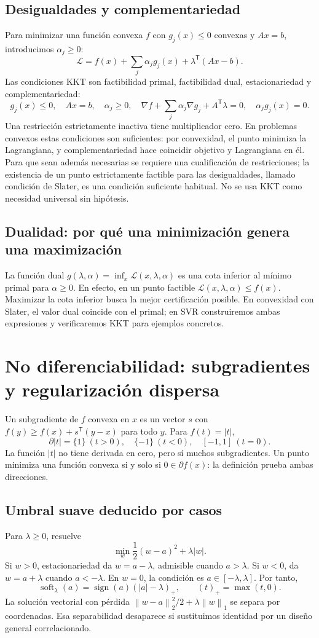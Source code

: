 \documentclass[11pt,a4paper]{article}
\newcommand{\T}{^{\mathsf T}}
\newcommand{\norm}[1]{\left\lVert #1\right\rVert}
\DeclareMathOperator{\sign}{sign}
\theoremstyle{definition}
\begin{document}
\subsection{Desigualdades y complementariedad}
Para minimizar una función convexa $f$ con $g_j(x)\le0$ convexas y $Ax=b$, introducimos $\alpha_j\ge0$:
\[
\mathcal L=f(x)+\sum_j\alpha_jg_j(x)+\lambda\T(Ax-b).
\]
Las condiciones KKT son factibilidad primal, factibilidad dual, estacionariedad y complementariedad:
\[
g_j(x)\le0,\quad Ax=b,\quad\alpha_j\ge0,\quad
\nabla f+\sum_j\alpha_j\nabla g_j+A\T\lambda=0,\quad\alpha_jg_j(x)=0.
\]
Una restricción estrictamente inactiva tiene multiplicador cero. En problemas convexos estas condiciones son suficientes: por convexidad, el punto minimiza la Lagrangiana, y complementariedad hace coincidir objetivo y Lagrangiana en él. Para que sean además necesarias se requiere una cualificación de restricciones; la existencia de un punto estrictamente factible para las desigualdades, llamado condición de Slater, es una condición suficiente habitual. No se usa KKT como necesidad universal sin hipótesis.
\subsection{Dualidad: por qué una minimización genera una maximización}
La función dual $g(\lambda,\alpha)=\inf_x\mathcal L(x,\lambda,\alpha)$ es una cota inferior al mínimo primal para $\alpha\ge0$. En efecto, en un punto factible $\mathcal L(x,\lambda,\alpha)\le f(x)$. Maximizar la cota inferior busca la mejor certificación posible. En convexidad con Slater, el valor dual coincide con el primal; en SVR construiremos ambas expresiones y verificaremos KKT para ejemplos concretos.

\section{No diferenciabilidad: subgradientes y regularización dispersa}
Un subgradiente de $f$ convexa en $x$ es un vector $s$ con $f(y)\ge f(x)+s\T(y-x)$ para todo $y$. Para $f(t)=|t|$,
\[
\partial|t|=\{1\}\ (t>0),\quad\{-1\}\ (t<0),\quad[-1,1]\ (t=0).
\]
La función $|t|$ no tiene derivada en cero, pero sí muchos subgradientes. Un punto minimiza una función convexa si y solo si $0\in\partial f(x)$: la definición prueba ambas direcciones.
\subsection{Umbral suave deducido por casos}
Para $\lambda\ge0$, resuelve
\[
\min_w\frac12(w-a)^2+\lambda|w|.
\]
Si $w>0$, estacionariedad da $w=a-\lambda$, admisible cuando $a>\lambda$. Si $w<0$, da $w=a+\lambda$ cuando $a<-\lambda$. En $w=0$, la condición es $a\in[-\lambda,\lambda]$. Por tanto,
\[
\boxed{\operatorname{soft}_\lambda(a)=\sign(a)(|a|-\lambda)_+},\qquad (t)_+=\max(t,0).
\]
La solución vectorial con pérdida $\norm{w-a}_2^2/2+\lambda\norm w_1$ se separa por coordenadas. Esa separabilidad desaparece si sustituimos identidad por un diseño general correlacionado.
\end{document}
